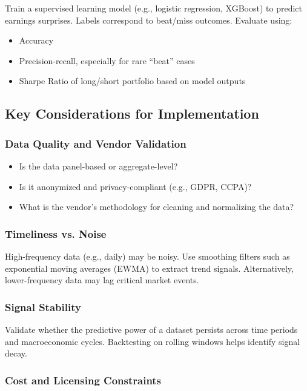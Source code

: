 Train a supervised learning model (e.g., logistic regression, XGBoost) to predict earnings surprises. Labels correspond to beat/miss outcomes. Evaluate using:

\begin{itemize}
    \item Accuracy
    \item Precision-recall, especially for rare ``beat'' cases
    \item Sharpe Ratio of long/short portfolio based on model outputs
\end{itemize}

\subsection{Key Considerations for Implementation}

\subsubsection{Data Quality and Vendor Validation}

\begin{itemize}
    \item Is the data panel-based or aggregate-level?
    \item Is it anonymized and privacy-compliant (e.g., GDPR, CCPA)?
    \item What is the vendor’s methodology for cleaning and normalizing the data?
\end{itemize}

\subsubsection{Timeliness vs. Noise}

High-frequency data (e.g., daily) may be noisy. Use smoothing filters such as exponential moving averages (EWMA) to extract trend signals. Alternatively, lower-frequency data may lag critical market events.

\subsubsection{Signal Stability}

Validate whether the predictive power of a dataset persists across time periods and macroeconomic cycles. Backtesting on rolling windows helps identify signal decay.

\subsubsection{Cost and Licensing Constraints}

